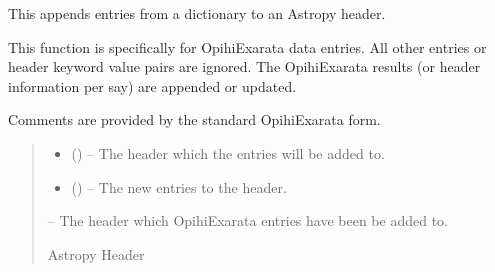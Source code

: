 \documentclass[letterpaper,11pt,english]{sphinxmanual}
\begin{document}
\begin{savenotes}\begin{fulllineitems}
\label{\detokenize{code/opihiexarata.library.fits:opihiexarata.library.fits.update_opihiexarata_fits_header}}
\pysigstartsignatures
{}
\pysigstopsignatures
\sphinxAtStartPar
This appends entries from a dictionary to an Astropy header.

\sphinxAtStartPar
This function is specifically for OpihiExarata data entries. All other
entries or header keyword value pairs are ignored. The OpihiExarata
results (or header information per say) are appended or updated.

\sphinxAtStartPar
Comments are provided by the standard OpihiExarata form.
\begin{quote}\begin{description}
\begin{itemize}
\item {} 
\sphinxAtStartPar
{} () – The header which the entries will be added to.

\item {} 
\sphinxAtStartPar
{} () – The new entries to the header.

\end{itemize}

\sphinxAtStartPar
{} – The header which OpihiExarata entries have been be added to.

\sphinxAtStartPar
Astropy Header

\end{description}\end{quote}

\end{fulllineitems}\end{savenotes}

\end{document}

